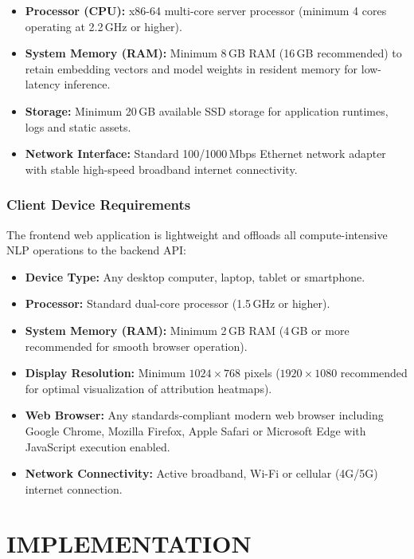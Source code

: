 \documentclass[12pt,a4paper,oneside]{report}
\begin{document}
\begin{itemize}[leftmargin=*, itemsep=3pt]
  \item \textbf{Processor (CPU):} x86-64 multi-core server processor (minimum 4 cores operating at
        2.2\,GHz or higher).
  \item \textbf{System Memory (RAM):} Minimum 8\,GB RAM (16\,GB recommended) to retain embedding
        vectors and model weights in resident memory for low-latency inference.
  \item \textbf{Storage:} Minimum 20\,GB available SSD storage for application runtimes, logs and static
        assets.
  \item \textbf{Network Interface:} Standard 100/1000\,Mbps Ethernet network adapter with stable
        high-speed broadband internet connectivity.
\end{itemize}

\subsection{Client Device Requirements}

The frontend web application is lightweight and offloads all compute-intensive NLP operations to the
backend API:

\begin{itemize}[leftmargin=*, itemsep=3pt]
  \item \textbf{Device Type:} Any desktop computer, laptop, tablet or smartphone.
  \item \textbf{Processor:} Standard dual-core processor (1.5\,GHz or higher).
  \item \textbf{System Memory (RAM):} Minimum 2\,GB RAM (4\,GB or more recommended for smooth browser
        operation).
  \item \textbf{Display Resolution:} Minimum $1024 \times 768$ pixels ($1920 \times 1080$ recommended
        for optimal visualization of attribution heatmaps).
  \item \textbf{Web Browser:} Any standards-compliant modern web browser including Google Chrome,
        Mozilla Firefox, Apple Safari or Microsoft Edge with JavaScript execution enabled.
  \item \textbf{Network Connectivity:} Active broadband, Wi-Fi or cellular (4G/5G) internet connection.
\end{itemize}

\chapter{IMPLEMENTATION}
\end{document}

